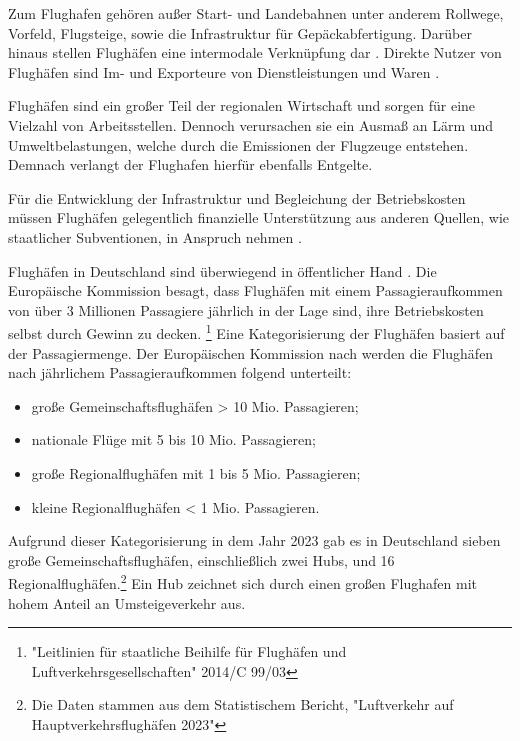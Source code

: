 Zum Flughafen gehören außer Start- und Landebahnen unter anderem 
Rollwege, Vorfeld, Flugsteige, sowie die Infrastruktur für Gepäckabfertigung. 
Darüber hinaus stellen Flughäfen eine intermodale Verknüpfung dar \cite{conrady2019luftverkehr}. %
Direkte Nutzer von Flughäfen sind Im- und Exporteure von Dienstleistungen und Waren \cite{schaar2010analysis}. 

Flughäfen sind ein großer Teil der regionalen Wirtschaft \cite{schaar2010analysis} 
und sorgen für eine Vielzahl von Arbeitsstellen. 
Dennoch verursachen sie ein Ausmaß an Lärm und Umweltbelastungen, 
welche durch die Emissionen der Flugzeuge entstehen.
Demnach verlangt der Flughafen hierfür ebenfalls Entgelte. %

Für die Entwicklung der Infrastruktur und Begleichung der Betriebskosten müssen Flughäfen 
gelegentlich finanzielle Unterstützung aus anderen Quellen, wie staatlicher Subventionen, 
in Anspruch nehmen \cite{schaar2010analysis}. 

Flughäfen in Deutschland sind überwiegend in öffentlicher Hand \cite{conrady2019luftverkehr}.
Die Europäische Kommission besagt, dass Flughäfen mit einem Passagieraufkommen von über 3 Millionen 
Passagiere jährlich in der Lage sind, ihre Betriebskosten selbst durch Gewinn zu decken.
\footnote{"Leitlinien für staatliche Beihilfe für Flughäfen und Luftverkehrsgesellschaften" 2014/C 99/03}
Eine Kategorisierung der Flughäfen basiert auf der Passagiermenge. 
Der Europäischen Kommission nach werden die Flughäfen nach jährlichem Passagieraufkommen folgend unterteilt: 
\begin{itemize}
    \item große Gemeinschaftsflughäfen > 10 Mio. Passagieren;
    \item nationale Flüge mit 5 bis 10 Mio. Passagieren;
    \item große Regionalflughäfen mit 1 bis 5 Mio. Passagieren;
    \item kleine Regionalflughäfen < 1 Mio. Passagieren.
\end{itemize}
Aufgrund dieser Kategorisierung in dem Jahr 2023 gab es in Deutschland 
sieben große Gemeinschaftsflughäfen, einschließlich zwei Hubs, und 16 Regionalflughäfen.\footnote{Die Daten stammen aus dem Statistischem Bericht, "Luftverkehr auf Hauptverkehrsflughäfen 2023"}
Ein Hub zeichnet sich durch einen großen Flughafen mit hohem Anteil an Umsteigeverkehr aus.

